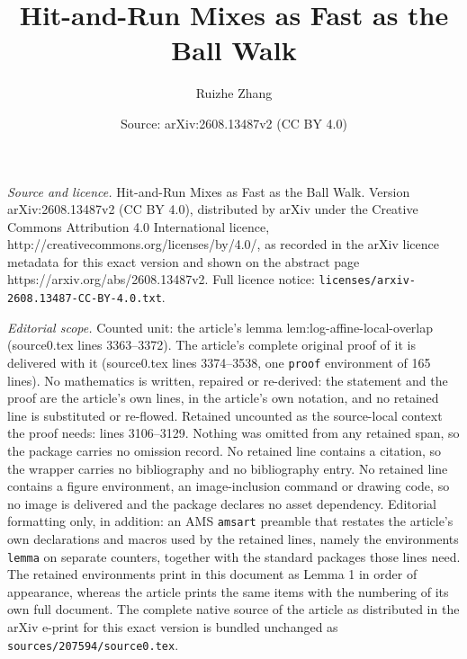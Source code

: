 \documentclass[10pt,a4paper]{amsart}
\title{Hit-and-Run Mixes as Fast as the Ball Walk}
\author{Ruizhe Zhang}
\date{Source: arXiv:2608.13487v2 (CC BY 4.0)}
\begin{document}
\maketitle

\noindent\emph{Source and licence.} Hit-and-Run Mixes as Fast as the Ball Walk. Version arXiv:2608.13487v2 (CC BY 4.0), distributed by arXiv under the Creative Commons Attribution 4.0 International licence, http://creativecommons.org/licenses/by/4.0/, as recorded in the arXiv licence metadata for this exact version and shown on the abstract page https://arxiv.org/abs/2608.13487v2. Full licence notice: \texttt{licenses/arxiv-2608.13487-CC-BY-4.0.txt}.\par\smallskip

\noindent\textit{Editorial scope.} Counted unit: the article's lemma lem:log-affine-local-overlap (source0.tex lines 3363--3372). The article's complete original proof of it is delivered with it (source0.tex lines 3374--3538, one \texttt{proof} environment of 165 lines). No mathematics is written, repaired or re-derived: the statement and the proof are the article's own lines, in the article's own notation, and no retained line is substituted or re-flowed.  Retained uncounted as the source-local context the proof needs: lines 3106--3129.  Nothing was omitted from any retained span, so the package carries no omission record.  No retained line contains a citation, so the wrapper carries no bibliography and no bibliography entry.  No retained line contains a figure environment, an image-inclusion command or drawing code, so no image is delivered and the package declares no asset dependency.  Editorial formatting only, in addition: an AMS \texttt{amsart} preamble that restates the article's own declarations and macros used by the retained lines, namely the environments \texttt{lemma} on separate counters, together with the standard packages those lines need.  The retained environments print in this document as Lemma 1 in order of appearance, whereas the article prints the same items with the numbering of its own full document.  The complete native source of the article as distributed in the arXiv e-print for this exact version is bundled unchanged as \texttt{sources/207594/source0.tex}.
\end{document}

